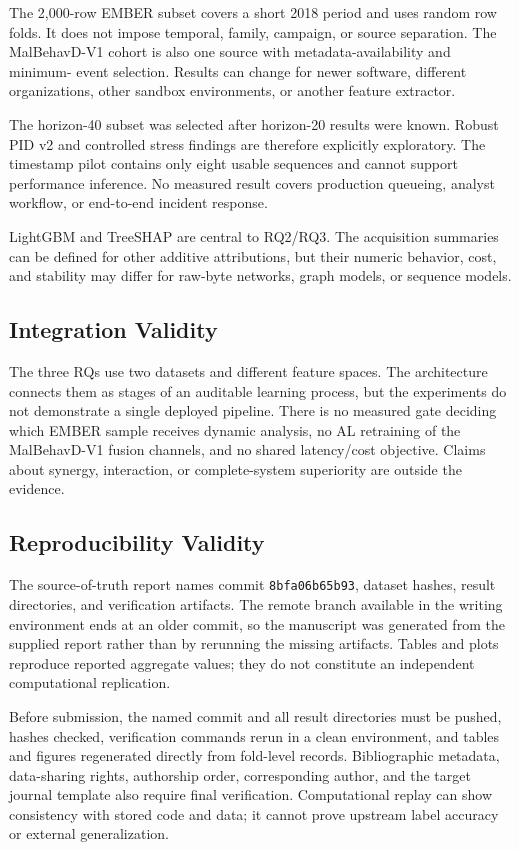 The 2,000-row EMBER subset covers a short 2018 period and uses random row folds.
It does not impose temporal, family, campaign, or source separation. The
MalBehavD-V1 cohort is also one source with metadata-availability and minimum-
event selection. Results can change for newer software, different organizations,
other sandbox environments, or another feature extractor.

The horizon-40 subset was selected after horizon-20 results were known. Robust
PID v2 and controlled stress findings are therefore explicitly exploratory. The
timestamp pilot contains only eight usable sequences and cannot support
performance inference. No measured result covers production queueing, analyst
workflow, or end-to-end incident response.

LightGBM and TreeSHAP are central to RQ2/RQ3. The acquisition summaries can be
defined for other additive attributions, but their numeric behavior, cost, and
stability may differ for raw-byte networks, graph models, or sequence models.

\subsection{Integration Validity}

The three RQs use two datasets and different feature spaces. The architecture
connects them as stages of an auditable learning process, but the experiments do
not demonstrate a single deployed pipeline. There is no measured gate deciding
which EMBER sample receives dynamic analysis, no AL retraining of the
MalBehavD-V1 fusion channels, and no shared latency/cost objective. Claims about
synergy, interaction, or complete-system superiority are outside the evidence.

\subsection{Reproducibility Validity}

The source-of-truth report names commit \texttt{8bfa06b65b93}, dataset hashes,
result directories, and verification artifacts. The remote branch available in
the writing environment ends at an older commit, so the manuscript was generated
from the supplied report rather than by rerunning the missing artifacts. Tables
and plots reproduce reported aggregate values; they do not constitute an
independent computational replication.

Before submission, the named commit and all result directories must be pushed,
hashes checked, verification commands rerun in a clean environment, and tables
and figures regenerated directly from fold-level records. Bibliographic metadata,
data-sharing rights, authorship order, corresponding author, and the target
journal template also require final verification. Computational replay can show
consistency with stored code and data; it cannot prove upstream label accuracy or
external generalization.
